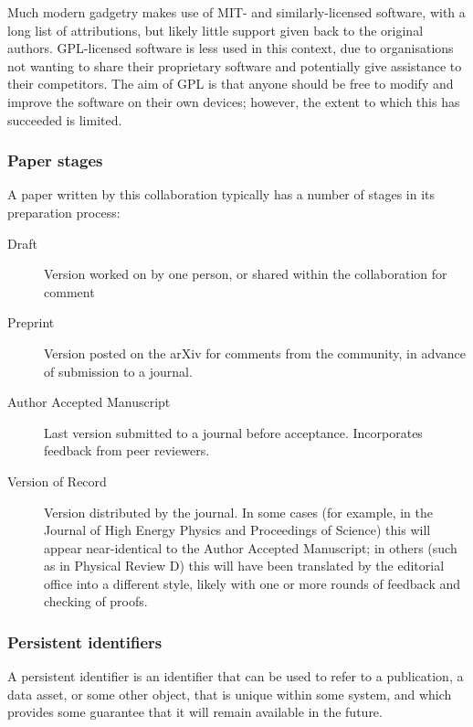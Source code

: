 \documentclass{article}
\begin{document}
Much modern gadgetry makes use of MIT- and similarly-licensed software,
with a long list of attributions,
but likely little support given back to the original authors.
GPL-licensed software is less used in this context,
due to organisations not wanting to share their proprietary software
and potentially give assistance to their competitors.
The aim of GPL is that
anyone should be free to modify and improve the software on their own devices;
however,
the extent to which this has succeeded is limited.

\subsubsection{Paper stages}

A paper written by this collaboration
typically has a number of stages in its preparation process:

\begin{description}
  \item[Draft]
        Version worked on by one person,
        or shared within the collaboration for comment
  \item[Preprint]
        Version posted on the arXiv for comments from the community,
        in advance of submission to a journal.
  \item[Author Accepted Manuscript]
        Last version submitted to a journal before acceptance.
        Incorporates feedback from peer reviewers.
  \item[Version of Record]
        Version distributed by the journal.
        In some cases
        (for example,
        in the Journal of High Energy Physics
        and Proceedings of Science)
        this will appear near-identical to the Author Accepted Manuscript;
        in others
        (such as in Physical Review D)
        this will have been
        translated by the editorial office into a different style,
        likely with one or more rounds of feedback
        and checking of proofs.
\end{description}

\subsubsection{Persistent identifiers}

A persistent identifier is
an identifier that can be used to refer to
a publication,
a data asset,
or some other object,
that is unique within some system,
and which provides some guarantee that it will remain available in the future.
\end{document}
